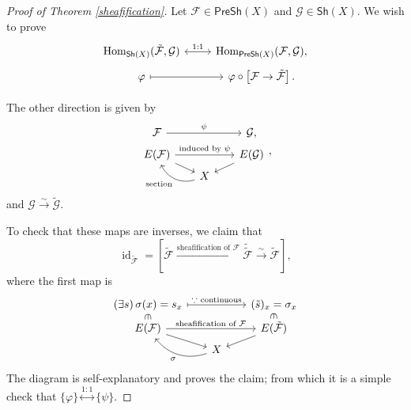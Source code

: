 \begin{proof}[Proof of Theorem \ref{sheafification}]
    Let $\mathcal{F}\in\mathsf{PreSh}(X)$ and $\mathcal{G}\in\mathsf{Sh}(X)$. We wish to prove
    \[ \begin{tikzcd}[row sep=3]
        \operatorname{Hom}_{\mathsf{Sh}(X)}(\tilde{\mathcal{F}},\mathcal{G}) \arrow[r, leftrightarrow, "1:1"] & \operatorname{Hom}_{\mathsf{PreSh}(X)}(\mathcal{F},\mathcal{G}), \\
        \varphi \arrow[r, mapsto] & \varphi\circ\left[\mathcal{F}\to\tilde{\mathcal{F}}\right].
    \end{tikzcd} \]

    The other direction is given by
    \[ \begin{tikzcd}[row sep=3, column sep=scriptsize]
        \mathcal{F} \arrow[rr, "\psi"] & & \mathcal{G}, \\
        E(\mathcal{F}) \arrow[rr, "\text{induced by }\psi"] \arrow[rd] && E(\mathcal{G}) \arrow[ld] \\
        & X \arrow[ul, bend left=42, "\text{section}", description]
    \end{tikzcd}, \]
    and $\mathcal{G}\xrightarrow{\sim}\tilde{\mathcal{G}}$.

    To check that these maps are inverses, we claim that
    $$\operatorname{id}_{\tilde{\mathcal{F}}}=\left[\tilde{\mathcal{F}}\xrightarrow{\text{sheafification of }\mathcal{F}}\tilde{\tilde{\mathcal{F}}}\xrightarrow{\sim}\tilde{\mathcal{F}}\right],$$
    where the first map is
    \[ \begin{tikzcd}[row sep=3, column sep=scriptsize]
        \left(\exists s\right)\sigma(x)=s_x \arrow[rr, mapsto, "\because\text{ continuous}"] \arrow[d, "\in", sloped, phantom, description] & & (\tilde{s})_x=\sigma_x \arrow[d, "\in", sloped, phantom, description] \\
        E(\mathcal{F}) \arrow[rr, "\text{sheafification of }\mathcal{F}"] \arrow[rd] & & E(\tilde{\mathcal{F}}) \arrow[ld] \\
        & X \arrow[ul, bend left=35, "\sigma"]
    \end{tikzcd} \]
    The diagram is self-explanatory and proves the claim; from which it is a simple check that $\{\varphi\}\stackrel{1:1}{\longleftrightarrow}\{\psi\}$.
\end{proof}


